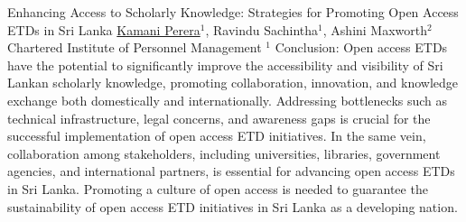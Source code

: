 \begin{abstract_online}{Enhancing Access to Scholarly Knowledge: Strategies for Promoting Open Access ETDs in Sri Lanka}{%
        \underline{Kamani Perera}$^{1}$, Ravindu Sachintha$^{1}$, Ashini Maxworth$^{2}$}{%
        Chartered Institute of Personnel Management}{%
        $^1$ }
    Conclusion: Open access ETDs have the potential to significantly improve the accessibility and visibility of Sri Lankan scholarly knowledge, promoting collaboration, innovation, and knowledge exchange both domestically and internationally. Addressing bottlenecks such as technical infrastructure, legal concerns, and awareness gaps is crucial for the successful implementation of open access ETD initiatives. In the same vein, collaboration among stakeholders, including universities, libraries, government agencies, and international partners, is essential for advancing open access ETDs in Sri Lanka. Promoting a culture of open access is needed to guarantee the sustainability of open access ETD initiatives in Sri Lanka as a developing nation.
\end{abstract_online}

